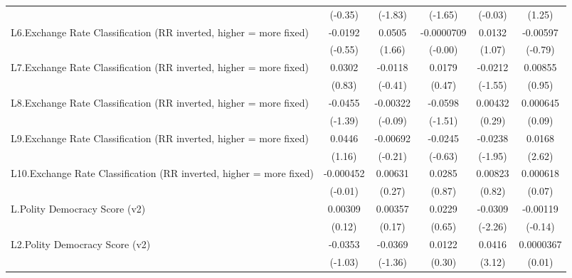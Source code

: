 {\begin{longtable}{l*{5}{c}}
                &  (-0.35)         &  (-1.83)         &  (-1.65)         &  (-0.03)         &   (1.25)         \\
\addlinespace
L6.Exchange Rate Classification (RR inverted, higher = more fixed)&  -0.0192         &   0.0505         &-0.0000709         &   0.0132         & -0.00597         \\
                &  (-0.55)         &   (1.66)         &  (-0.00)         &   (1.07)         &  (-0.79)         \\
\addlinespace
L7.Exchange Rate Classification (RR inverted, higher = more fixed)&   0.0302         &  -0.0118         &   0.0179         &  -0.0212         &  0.00855         \\
                &   (0.83)         &  (-0.41)         &   (0.47)         &  (-1.55)         &   (0.95)         \\
\addlinespace
L8.Exchange Rate Classification (RR inverted, higher = more fixed)&  -0.0455         & -0.00322         &  -0.0598         &  0.00432         & 0.000645         \\
                &  (-1.39)         &  (-0.09)         &  (-1.51)         &   (0.29)         &   (0.09)         \\
\addlinespace
L9.Exchange Rate Classification (RR inverted, higher = more fixed)&   0.0446         & -0.00692         &  -0.0245         &  -0.0238         &   0.0168\sym{**} \\
                &   (1.16)         &  (-0.21)         &  (-0.63)         &  (-1.95)         &   (2.62)         \\
\addlinespace
L10.Exchange Rate Classification (RR inverted, higher = more fixed)&-0.000452         &  0.00631         &   0.0285         &  0.00823         & 0.000618         \\
                &  (-0.01)         &   (0.27)         &   (0.87)         &   (0.82)         &   (0.07)         \\
\addlinespace
L.Polity Democracy Score (v2)&  0.00309         &  0.00357         &   0.0229         &  -0.0309\sym{*}  & -0.00119         \\
                &   (0.12)         &   (0.17)         &   (0.65)         &  (-2.26)         &  (-0.14)         \\
\addlinespace
L2.Polity Democracy Score (v2)&  -0.0353         &  -0.0369         &   0.0122         &   0.0416\sym{**} &0.0000367         \\
                &  (-1.03)         &  (-1.36)         &   (0.30)         &   (3.12)         &   (0.01)         \\

\end{longtable}}
